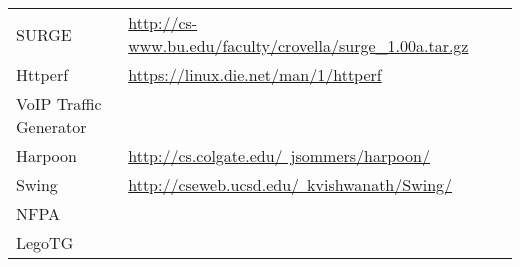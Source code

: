 \begin{table}[ht!]
\begin{tabularx}{\textwidth}{@{}ll@{} p{10.0cm}}
SURGE                   & \href{http://cs-www.bu.edu/faculty/crovella/surge_1.00a.tar.gz}{http://cs-www.bu.edu/faculty/crovella/surge\_1.00a.tar.gz}                                                                                                \\
Httperf                 & \href{https://linux.die.net/man/1/httperf}{https://linux.die.net/man/1/httperf}                                                                                                                                           \\
VoIP Traffic Generator  &                                                                                                                                                                                                                           \\
Harpoon                 & \href{http://cs.colgate.edu/~jsommers/harpoon/}{http://cs.colgate.edu/~jsommers/harpoon/}                                                                                                                                 \\
Swing                   & \href{http://cseweb.ucsd.edu/~kvishwanath/Swing/}{http://cseweb.ucsd.edu/~kvishwanath/Swing/}                                                                                                                             \\
NFPA                    &                                                                                                                                                                                                                           \\
LegoTG                  &                                                                                                                                                                                                                           \\ \bottomrule
\end{tabularx}
\end{table}


